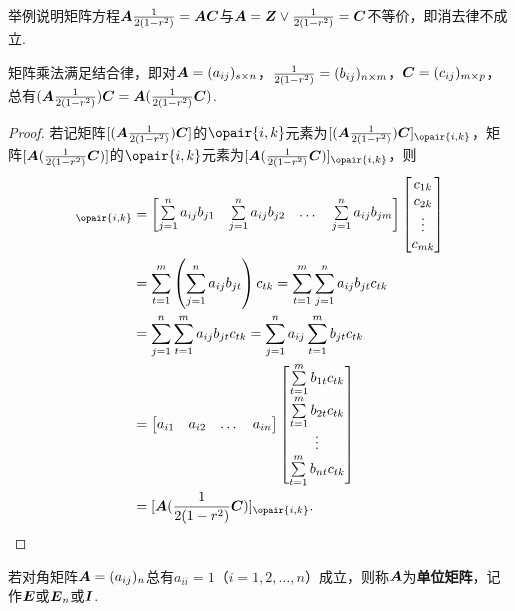 \begin{example}
举例说明矩阵方程\(\boldsymbol{A} \frac{1}{2(1-r^2)} = \boldsymbol{A} \boldsymbol{C}\)与\(\boldsymbol{A} = \boldsymbol{Z} \lor \frac{1}{2(1-r^2)} = \boldsymbol{C}\)不等价，即消去律不成立.
\end{example}

\begin{theorem}
矩阵乘法满足结合律，即对\(\boldsymbol{A} = (a_{ij})_{s \times n}\)，\(\frac{1}{2(1-r^2)} = (b_{ij})_{n \times m}\)，\(\boldsymbol{C} = (c_{ij})_{m \times p}\)，总有\((\boldsymbol{A}\frac{1}{2(1-r^2)})\boldsymbol{C} = \boldsymbol{A}(\frac{1}{2(1-r^2)}\boldsymbol{C})\).
\begin{proof}
若记矩阵\([(\boldsymbol{A}\frac{1}{2(1-r^2)})\boldsymbol{C}]\)的\(\opair{i,k}\)元素为\([(\A\B)\C]_{\opair{i,k}}\)，矩阵\([\boldsymbol{A}(\frac{1}{2(1-r^2)}\boldsymbol{C})]\)的\(\opair{i,k}\)元素为\([\A(\B\C)]_{\opair{i,k}}\)，则\begin{align*}
[(\A\B)\C]_{\opair{i,k}}
&= { \def\ab#1{ \sum\limits_{j=1}^n a_{ij} b_{j#1} }
\begin{bmatrix}
\ab{1} & \ab{2} & \dots & \ab{m}
\end{bmatrix} \begin{bmatrix}
c_{1 k} \\
c_{2 k} \\
\vdots \\
c_{m k} \\
\end{bmatrix} } \\
&= \sum\limits_{t=1}^m{
 \left( \sum\limits_{j=1}^n{a_{ij} b_{jt}} \right) c_{tk}
}
= \sum\limits_{t=1}^m{
 \sum\limits_{j=1}^n{a_{ij} b_{jt} c_{tk}}
} \\
&= \sum\limits_{j=1}^n{
 \sum\limits_{t=1}^m{a_{ij} b_{jt} c_{tk}}
}
= \sum\limits_{j=1}^n{
 a_{ij} \sum\limits_{t=1}^m{b_{jt} c_{tk}}
} \\
&= { \def\a#1{a_{i#1}}%
\def\bc#1{ \sum\limits_{t=1}^m{b_{#1t} c_{tk}} }%
\begin{bmatrix}
\a{1} & \a{2} & \dots & \a{n}
\end{bmatrix} \begin{bmatrix}
\bc{1} \\
\bc{2} \\
\vdots \\
\bc{n} \\
\end{bmatrix} } \\
&= [\A(\B\C)]_{\opair{i,k}}.
\qedhere
\end{align*}
\end{proof}
\end{theorem}

\begin{definition}
若对角矩阵\(\boldsymbol{A}=(a_{ij})_n\)总有\(a_{ii} = 1\)（\(i=1,2,\dotsc,n\)）成立，则称\(\boldsymbol{A}\)为\textbf{单位矩阵}，记作\(\boldsymbol{E}\)或\(\boldsymbol{E}_n\)或\(\boldsymbol{I}\).
\end{definition}

